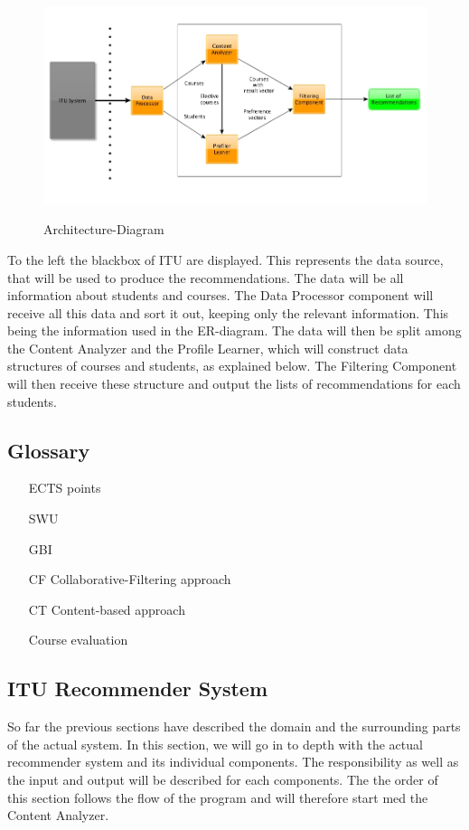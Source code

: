 \begin{figure}[H]
\centering
\includegraphics[scale=0.5]{Pictures/Architecture-Diagram.jpg}
\label{Architecture-Diagram}
\caption{Architecture-Diagram}
\end{figure}


To the left the blackbox of ITU are displayed. This represents the data source, that will be used to produce the recommendations. The data will be all information about students and courses. The Data Processor component will receive all this data and sort it out, keeping only the relevant information. This being the information used in the ER-diagram. The data will then be split among the Content Analyzer and the Profile Learner, which will construct data structures of courses and students, as explained below. The Filtering Component will then receive these structure and output the lists of recommendations for each students. 


\subsection{Glossary}
\label{glossary}
\begin{itemize}
	\item[ECTS points]
	\item[SWU]
	\item[GBI]
	\item[CF] Collaborative-Filtering approach
	\item[CT] Content-based approach
	\item[Course evaluation]
\end{itemize}
\subsection{ITU Recommender System}
So far the previous sections have described the domain and the surrounding parts of the actual system. In this section, we will go in to depth with the actual recommender system and its individual components. The responsibility as well as the input and output will be described for each components. The the order of this section follows the flow of the program and will therefore start med the Content Analyzer.
